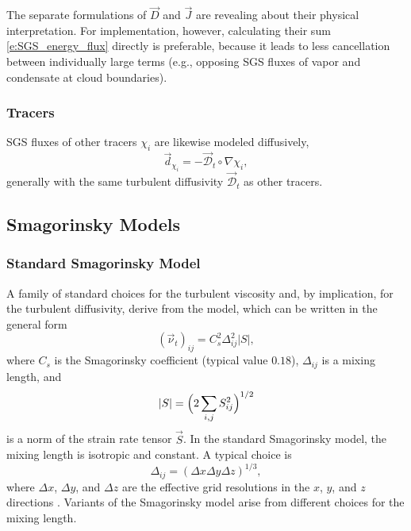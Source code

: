\documentclass{article}
\begin{document}
The separate formulations of $\vec{D}$ and $\vec{J}$ are revealing about their physical interpretation. For implementation, however, calculating their sum \eqref{e:SGS_energy_flux} directly is preferable, because it leads to less cancellation between individually large terms (e.g., opposing SGS fluxes of vapor and condensate at cloud boundaries).

\subsubsection{Tracers}

SGS fluxes of other tracers $\chi_i$ are likewise modeled diffusively,
\begin{equation}\label{eq:sgs-tracer-flux}
\vec{d}_{\chi_i} = - \vec{\mathcal{D}}_t \circ \nabla \chi_i,
\end{equation}
generally with the same turbulent diffusivity $\vec{\mathcal{D}}_t$ as other tracers.

\subsection{Smagorinsky Models}

\subsubsection{Standard Smagorinsky Model}

A family of standard choices for the turbulent viscosity and, by implication, for the turbulent diffusivity, derive from the \citet{smagorinsky:1963} model, which can be written in the general form 
\begin{equation}
(\vec{\nu}_t)_{ij} = C_{s}^2 \Delta^{2}_{ij} |S|,   
\label{eq:eddy-viscosity_smag}
\end{equation}
where $C_{s} $ is the Smagorinsky coefficient (typical value $0.18$), $\Delta_{ij}$ is a mixing length, and 
\begin{equation}
|S| = \Bigl(2 \sum_{i,j} S_{ij}^2 \Bigr)^{1/2}
\end{equation} 
is a norm of the strain rate tensor $\vec{S}$. In the standard Smagorinsky model, the mixing length is isotropic and constant. A typical choice is 
\begin{equation}
    \Delta_{ij} = (\Delta x \Delta y \Delta z)^{1/3},
\end{equation}
where $\Delta x$, $\Delta y$, and $\Delta z$ are the effective grid resolutions in the $x$, $y$, and $z$ directions \citep{deardorff1970}. Variants of the Smagorinsky model arise from different choices for the mixing length.
\end{document}
